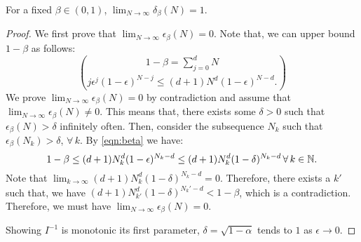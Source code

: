 \begin{corollary}For a fixed $\beta \in (0,1)$, $\lim_{N \to \infty} \delta_\beta(N) = 1$.
\end{corollary}

\begin{proof} 
We first prove that $\lim_{N \to \infty} \epsilon_\beta(N) = 0$. Note that, we can upper bound $1-\beta$ as follows:
\begin{equation}\label{eqn:beta}1-\beta = \sum_{j=0}^d {N}\choose{j} \epsilon^j (1-\epsilon)^{N-j} \leq  (d+1)N^d (1-\epsilon)^{N-d}.
\end{equation}
We prove $\lim_{N \to \infty} \epsilon_\beta(N) = 0$ by contradiction and assume that $\lim_{N \to \infty} \epsilon_\beta(N) \not= 0$. This means that, there exists some $\delta > 0$ such that $\epsilon_\beta(N) > \delta$ infinitely often. Then, consider the subsequence $N_k$ such that $\epsilon_\beta(N_k) > \delta$, $\forall\, k.$ By \eqref{eqn:beta} we have:
\begin{equation*}1-\beta \leq (d+1)N_k^d (1-\epsilon)^{N_k-d} \leq (d+1)N_k^d (1-\delta)^{N_k-d}\, \forall\,k \in \mathbb{N}. 
\end{equation*}
Note that $\lim_{k \to \infty}(d+1)N_k^d (1-\delta)^{N_k-d} = 0.$ Therefore, there exists a $k'$ such that, we have $ (d+1)N_{k'}^d (1-\delta)^{N_k'-d} < 1 -\beta$, which is a contradiction. Therefore, we must have  $\lim_{N \to \infty} \epsilon_\beta(N) = 0$.

Showing $I^{-1}$ is monotonic its first parameter, $\delta = \sqrt{1-\alpha}$ tends to $1$ as $\epsilon \to 0$.

\end{proof}

